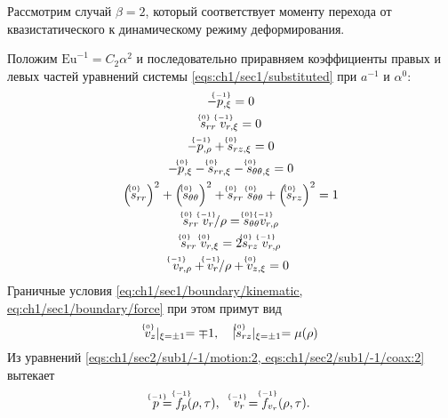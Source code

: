Рассмотрим случай $\beta=2$, который соответствует моменту перехода от квазистатического к динамическому режиму деформирования.

Положим $\text{Eu}^{-1} = C_2 \alpha^2$ и последовательно приравняем коэффициенты правых и левых частей уравнений системы \cref{eqs:ch1/sec1/substituted} при $a^{-1}$ и $\alpha^0$:
\begingroup
\allowdisplaybreaks
\begin{subequations}
  \label{eqs:ch1/sec2/sub1/main}
  \begin{gather}
    \label{eqs:ch1/sec2/sub1/-1/motion:2}
    -\uindex{p}{-1}_{,\xi} = 0
    \\
    \label{eqs:ch1/sec2/sub1/-1/coax:2}
    \uindex{s}{0}_{rr} \; \uindex{v}{-1}_{r,\xi} = 0
    \\
    \label{eqs:ch1/sec2/sub1/0/motion:1}
    -\uindex{p}{-1}_{,\rho}+\uindex{s}{0}_{rz,\xi} = 0
    \\
    \label{eqs:ch1/sec2/sub1/0/motion:2}
    -\uindex{p}{0}_{,\xi} - \uindex{s}{0}_{rr,\xi} - \uindex{s}{0}_{\theta\theta,\xi} = 0
    \\
    \label{eqs:ch1/sec2/sub1/0/plasticity}
    \left(\uindex{s}{0}_{rr}\right)^2 + \left(\uindex{s}{0}_{\theta\theta}\right)^2 + \uindex{s}{0}_{rr}\; \uindex{s}{0}_{\theta\theta} + \left(\uindex{s}{0}_{rz}\right)^2 = 1
    \\
    \label{eqs:ch1/sec2/sub1/0/coax:1}
    \uindex{s}{0}_{rr} \; \uindex{v}{-1}_{r} / \rho = \uindex{s}{0}_{\theta\theta} \uindex{v}{-1}_{r,\rho}
    \\
    \label{eqs:ch1/sec2/sub1/0/coax:2}
    \uindex{s}{0}_{rr} \; \uindex{v}{0}_{r,\xi} = 2 \uindex{s}{0}_{rz} \; \uindex{v}{-1}_{r,\rho}
    \\
    \label{eqs:ch1/sec2/sub1/0/uncompress}
    \uindex{v}{-1}_{r,\rho} + \uindex{v}{-1}_{r} / \rho + \uindex{v}{0}_{z,\xi} = 0
  \end{gather}
\end{subequations}
\endgroup
Граничные условия \cref{eq:ch1/sec1/boundary/kinematic, eq:ch1/sec1/boundary/force} при этом примут вид
\begin{equation}
  \label{eq:ch1/sec1/sub1/boundary/0}
  \uindex{v}{0}_{z}\lvert_{\xi=\pm 1} = \mp 1, \quad \lvert \uindex{s}{0}_{rz}\lvert_{\xi=\pm 1} = \mu(\rho)
\end{equation}
Из уравнений \cref{eqs:ch1/sec2/sub1/-1/motion:2, eqs:ch1/sec2/sub1/-1/coax:2} вытекает
\begin{equation*}
  \uindex{p}{-1} = \uindex{f}{-1}_{p}(\rho, \tau), \quad \uindex{v}{-1}_{r} = \uindex{f}{-1}_{v_{r}}(\rho, \tau).
\end{equation*}
